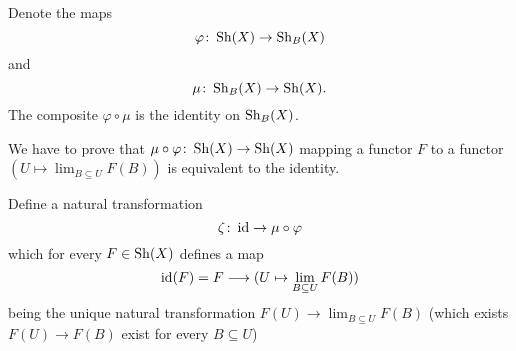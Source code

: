 \begin{exercise}{4}
    Denote the maps
    \begin{equation*}
        \varphi \colon \operatorname{Sh}(X) \rightarrow \operatorname{Sh}_B(X)
    \end{equation*}
    and
    \begin{equation*}
        \mu \colon \operatorname{Sh}_B(X) \rightarrow \operatorname{Sh}(X).
    \end{equation*}
    The composite $\varphi \circ \mu$ is the identity on $\operatorname{Sh}_B(X)$.

    We have to prove that $\mu \circ \varphi \colon \operatorname{Sh}(X) \rightarrow \operatorname{Sh}(X)$
    mapping a functor $F$ to a functor $(U \mapsto \lim_{B \subseteq U} F(B))$
    is equivalent to the identity.

    Define a natural transformation
    \begin{equation*}
        \zeta \colon \operatorname{id} \rightarrow \mu \circ \varphi
    \end{equation*}
    which for every $F \in \operatorname{Sh}(X)$ defines a map
    \begin{equation*}
        \operatorname{id}(F) = F \longrightarrow (U \mapsto \lim_{B \subseteq U} F(B))
    \end{equation*}
    being the unique natural transformation $F(U) \rightarrow \lim_{B \subseteq
    U} F(B)$ (which exists $F(U) \rightarrow F(B)$ exist for every $B \subseteq
    U$)

\end{exercise}


